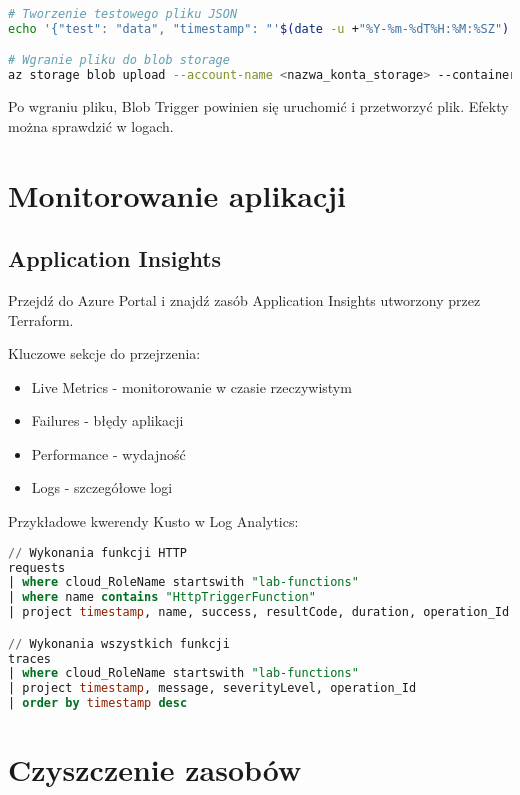 \documentclass{article}
\begin{document}
\begin{lstlisting}[language=bash]
# Tworzenie testowego pliku JSON
echo '{"test": "data", "timestamp": "'$(date -u +"%Y-%m-%dT%H:%M:%SZ")'"}' > test-file.json

# Wgranie pliku do blob storage
az storage blob upload --account-name <nazwa_konta_storage> --container-name samples-workitems --name test-blob.json --file test-file.json --auth-mode login
\end{lstlisting}

Po wgraniu pliku, Blob Trigger powinien się uruchomić i przetworzyć plik. Efekty można sprawdzić w logach.

\section{Monitorowanie aplikacji}

\subsection{Application Insights}

Przejdź do Azure Portal i znajdź zasób Application Insights utworzony przez Terraform.

Kluczowe sekcje do przejrzenia:
\begin{itemize}
    \item Live Metrics - monitorowanie w czasie rzeczywistym
    \item Failures - błędy aplikacji
    \item Performance - wydajność
    \item Logs - szczegółowe logi
\end{itemize}

Przykładowe kwerendy Kusto w Log Analytics:

\begin{lstlisting}[language=SQL]
// Wykonania funkcji HTTP
requests
| where cloud_RoleName startswith "lab-functions"
| where name contains "HttpTriggerFunction"
| project timestamp, name, success, resultCode, duration, operation_Id

// Wykonania wszystkich funkcji
traces
| where cloud_RoleName startswith "lab-functions"
| project timestamp, message, severityLevel, operation_Id
| order by timestamp desc
\end{lstlisting}

\section{Czyszczenie zasobów}
\end{document}
